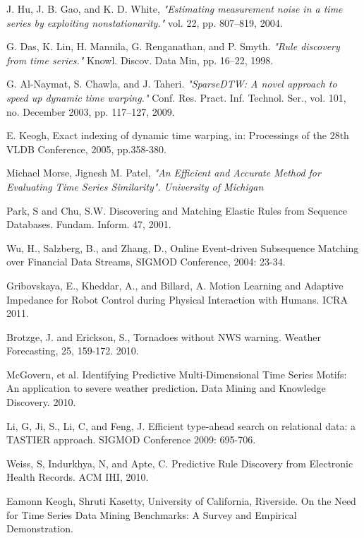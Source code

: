 \begin{thebibliography}{9}
J. Hu, J. B. Gao, and K. D. White, \textit{"Estimating measurement noise in a time series by exploiting nonstationarity."} vol. 22, pp. 807–819, 2004.

G. Das, K. Lin, H. Mannila, G. Renganathan, and P. Smyth. \textit{"Rule discovery from time series."} Knowl. Discov. Data Min, pp. 16–22, 1998.

G. Al-Naymat, S. Chawla, and J. Taheri. \textit{"SparseDTW: A novel approach to speed up dynamic time warping."} Conf. Res. Pract. Inf. Technol. Ser., vol. 101, no. December 2003, pp. 117–127, 2009.

E. Keogh, Exact indexing of dynamic time warping, in: Processings of the 28th VLDB Conference, 2005, pp.358-380.

Michael Morse, Jignesh M. Patel, \textit{"An Efficient and Accurate Method for Evaluating Time Series Similarity". University of Michigan}

Park, S and Chu, S.W. Discovering and Matching Elastic Rules from Sequence Databases. Fundam. Inform. 47, 2001.

Wu, H., Salzberg, B., and Zhang, D., Online Event-driven Subsequence Matching over Financial Data Streams, SIGMOD Conference, 2004: 23-34.

Gribovskaya, E., Kheddar, A., and Billard, A. Motion Learning and Adaptive Impedance for Robot Control during Physical Interaction with Humans. ICRA 2011.

Brotzge, J. and Erickson, S., Tornadoes without NWS warning. Weather Forecasting, 25, 159-172. 2010.

McGovern, et al. Identifying Predictive Multi-Dimensional Time Series Motifs: An application to severe weather prediction. Data Mining and Knowledge Discovery. 2010.

Li, G, Ji, S., Li, C, and Feng, J. Efficient type-ahead search on relational data: a TASTIER approach. SIGMOD Conference 2009: 695-706.

Weiss, S, Indurkhya, N, and Apte, C. Predictive Rule Discovery from Electronic Health Records. ACM IHI, 2010.

Eamonn Keogh, Shruti Kasetty, University of California, Riverside. On the Need for Time Series Data Mining Benchmarks: A Survey and Empirical Demonstration.


\end{thebibliography}
